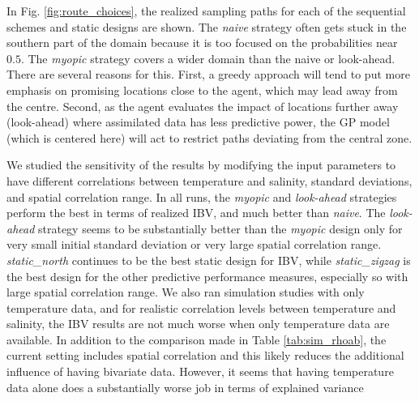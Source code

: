 \documentclass[aoas]{imsart}
\begin{document}
In Fig. \ref{fig:route_choices}, the realized sampling paths for each
of the sequential schemes and static designs are shown. The
\textit{naive} strategy often gets stuck in the southern part of the
domain because it is too focused on the probabilities near $0.5$. The
\textit{myopic} strategy covers a wider domain than the naive or
look-ahead. There are several reasons for this. First, a greedy
approach will tend to put more emphasis on promising locations close
to the agent, which may lead away from the centre. Second, as the
agent evaluates the impact of locations further away (look-ahead)
where assimilated data has less predictive power, the GP model (which
is centered here) will act to restrict paths deviating from the
central zone.

We studied the sensitivity of the results by modifying the input
parameters to have different correlations between temperature and
salinity, standard deviations, and spatial correlation range.  In all
runs, the \textit{myopic} and \textit{look-ahead} strategies perform
the best in terms of realized IBV, and much better than
\textit{naive}. The \textit{look-ahead} strategy seems to be
substantially better than the \textit{myopic} design only for very
small initial standard deviation or very large spatial correlation
range. \textit{static\_north} continues to be the best static design
for IBV, while \textit{static\_zigzag} is the best design for the
other predictive performance measures, especially so with large
spatial correlation range. We also ran simulation studies with only
temperature data, and for realistic correlation levels between
temperature and salinity, the IBV results are not much worse when only
temperature data are available. In addition to the comparison made in
Table \ref{tab:sim_rhoab}, the current setting includes spatial
correlation and this likely reduces the additional influence of having
bivariate data. However, it seems that having temperature data alone
does a substantially worse job in terms of explained variance
\end{document}
